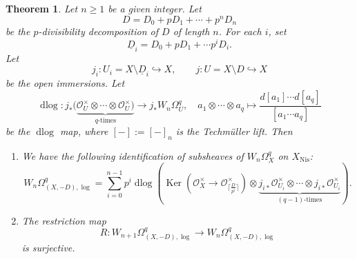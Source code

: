 \documentclass[11pt]{amsart}
\newcommand{\ra}{\rightarrow}
\newcommand{\cO}{\mathcal{O}}
\newcommand{\Ker}{\operatorname{Ker}}
\newcommand{\dlog}{\operatorname{dlog}}
\newcommand{\hra}{\hookrightarrow}
\newcommand{\Nis}{{\operatorname{Nis}}}
\newcommand{\ul}{\underline}
\theoremstyle{plain}
\newtheorem{thm}[prop]{Theorem}
\theoremstyle{definition}
\numberwithin{equation}{prop}
\begin{document}
\begin{thm}
\label{thm2}
Let $n\ge 1$ be a given integer.
Let $$D=D_0+pD_1+\cdots +p^{n}D_{n}$$ be the $p$-divisibility decomposition of $D$ of length $n$.
For each $i$, set
$$\ul D_i=D_0+pD_1+\cdots p^iD_i.$$
Let
$$j_i:U_i=X\setminus \ul D_i\hra X,\qquad
j:U=X\setminus D\hra X$$ be the open immersions.
Let 
$$\dlog:j_*(\underbrace{\cO_{U}^\times \otimes \cdots \otimes \cO_{U}^\times)}_{q\text{-times}}
\ra j_*W_{n}\Omega^q_U,\quad 
a_1\otimes \cdots\otimes a_q\mapsto \frac{d[a_1]\cdots d[a_q]}{[a_1\cdots a_q]}$$
be the $\dlog$ map, where $[-]:=[-]_{n}$ is the Techm\"uller lift.
Then
\begin{enumerate}
\item 
We have the following identification of subsheaves of $W_n\Omega^q_X$ on $X_\Nis$:
$$W_n\Omega^q_{(X,-D),\log}=\sum_{i=0}^{n-1} 
  p^i \dlog\left(
 \Ker(\cO_X^\times\ra \cO_{ \lceil\frac{D}{p^i}\rceil}^ \times)\otimes
\underbrace{ j_{i*}\cO_{U_i}^\times \otimes \cdots \otimes j_{i*}\cO_{U_i}^\times}_{(q-1)\text{-times}} \right).$$
\item 
The restriction map
$$R:W_{n+1}\Omega^q_{(X,-D),\log}\ra W_n\Omega^q_{(X,-D),\log}$$
is surjective.
\end{enumerate}
\end{thm}
\end{document}
